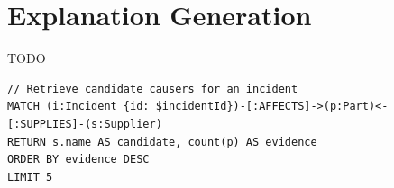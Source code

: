 \section{Explanation Generation}\label{sec:method_expl}
TODO

\begin{lstlisting}[style=cypher,
                   caption={Example graph query (placeholder).},
                   label=lst:cypher]
// Retrieve candidate causers for an incident
MATCH (i:Incident {id: $incidentId})-[:AFFECTS]->(p:Part)<-[:SUPPLIES]-(s:Supplier)
RETURN s.name AS candidate, count(p) AS evidence
ORDER BY evidence DESC
LIMIT 5
\end{lstlisting}
